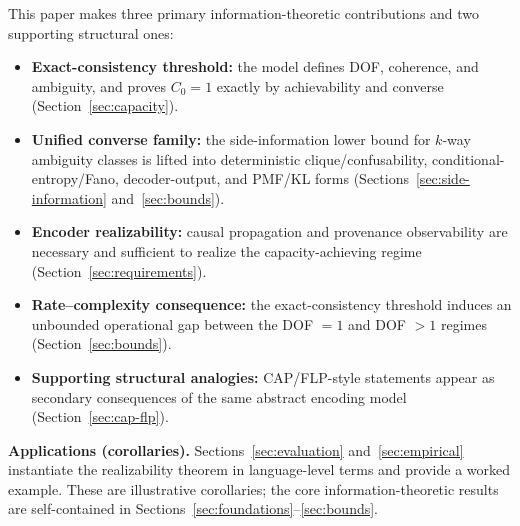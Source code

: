 This paper makes three primary information-theoretic contributions and two supporting structural ones:

\begin{itemize}
\tightlist
\item \textbf{Exact-consistency threshold:} the model defines DOF, coherence, and ambiguity, and proves $C_0=1$ exactly by achievability and converse (Section~\ref{sec:capacity}).
\item \textbf{Unified converse family:} the side-information lower bound for $k$-way ambiguity classes is lifted into deterministic clique/confusability, conditional-entropy/Fano, decoder-output, and PMF/KL forms (Sections~\ref{sec:side-information} and~\ref{sec:bounds}).
\item \textbf{Encoder realizability:} causal propagation and provenance observability are necessary and sufficient to realize the capacity-achieving regime (Section~\ref{sec:requirements}).
\item \textbf{Rate--complexity consequence:} the exact-consistency threshold induces an unbounded operational gap between the DOF $=1$ and DOF $>1$ regimes (Section~\ref{sec:bounds}).
\item \textbf{Supporting structural analogies:} CAP/FLP-style statements appear as secondary consequences of the same abstract encoding model (Section~\ref{sec:cap-flp}).
\end{itemize}

\textbf{Applications (corollaries).} Sections~\ref{sec:evaluation} and~\ref{sec:empirical} instantiate the realizability theorem in language-level terms and provide a worked example. These are illustrative corollaries; the core information-theoretic results are self-contained in Sections~\ref{sec:foundations}--\ref{sec:bounds}.


